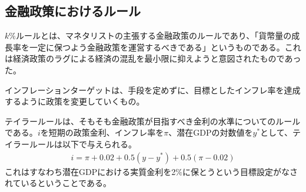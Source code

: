 \documentclass{jsarticle}
\begin{document}
\subsection{金融政策におけるルール}
$k\%$ルールとは、マネタリストの主張する金融政策のルールであり、「貨幣量の成長率を一定に保つよう金融政策を運営するべきである」というものである。これは経済政策のラグによる経済の混乱を最小限に抑えようと意図されたものであった。

インフレーションターゲットは、手段を定めずに、目標としたインフレ率を達成するように政策を変更していくもの。

テイラールールは、そもそも金融政策が目指すべき金利の水準についてのルールである。$i$を短期の政策金利、インフレ率を$\pi$、潜在GDPの対数値を$y^*$として、テイラールールは以下で与えられる。
\begin{align}
	i = \pi + 0.02 + 0.5(y - y^*) + 0.5(\pi -0.02)
\end{align}
これはすなわち潜在GDPにおける実質金利を2$\%$に保とうという目標設定がなされているということである。
\end{document}
